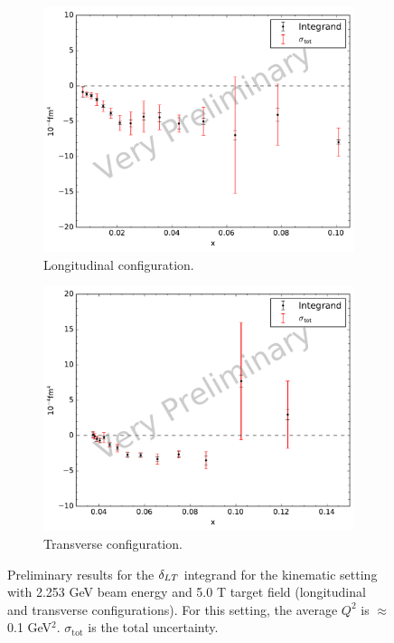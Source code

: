 \begin{figure}[p!]
  \centering
  \begin{subfigure}[t]{0.79\textwidth}
    \includegraphics[width=\textwidth]{figs/dlt-model-22535000.pdf}
    \caption{Longitudinal configuration. \label{C8S5F2a}}
  \end{subfigure}
  \begin{subfigure}[t]{0.79\textwidth}
    \includegraphics[width=\textwidth]{figs/dlt-model-22535090.pdf}
    \caption{Transverse configuration. \label{C8S5F2b}}
  \end{subfigure}
  \caption[$\dlt$ integrand with $E=2.253$ GeV and $B=5.0$ T.]{Preliminary results for the $\dlt$ integrand for the kinematic setting with 2.253 GeV beam energy and 5.0 T target field (longitudinal and transverse configurations). For this setting, the average $Q^2$ is $\approx$ 0.1 GeV${}^2$. $\sigma_{\mathrm{tot}}$ is the total uncertainty. \label{C8S5F2}}
\end{figure}

